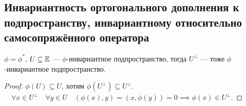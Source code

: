 \subsection{Инвариантность ортогонального дополнения к подпространству, инвариантному относительно самосопряжённого оператора}

\begin{proposal}
    $\phi = \phi^{*}$, $U \subseteq \mathbb{E}$ --- $\phi$-инвариантное подпространство, тогда $U^{\perp}$ --- тоже $\phi$-инвариантное подпространство.
\end{proposal}

\begin{proof}
    $\phi(U) \subseteq U$, хотим $\phi(U^{\perp}) \subseteq U^{\perp}$. $\quad \forall x \in U^{\perp} \quad \forall y \in U \quad (\phi(x), y) = (x, \phi(y)) = 0 \implies \phi(x) \in U^{\perp}$.
\end{proof}
